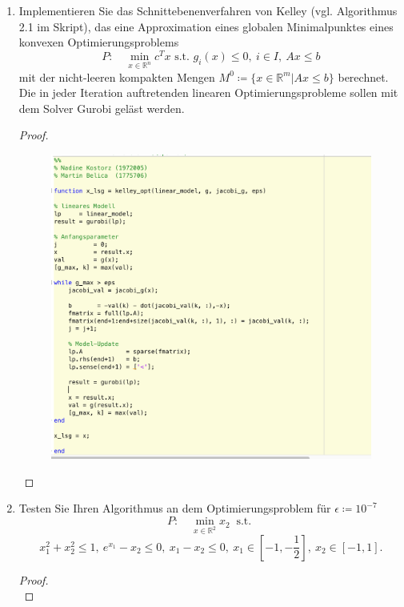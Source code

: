 \documentclass[12pt]{extreport} %
\newcommand{\R}{\mathbb{R}}
\theoremstyle{named}
\theoremstyle{nnamed}
\theoremstyle{itshape}
\theoremstyle{normal}
\begin{document}
\begin{enumerate}
	\item Implementieren Sie das Schnittebenenverfahren von Kelley (vgl. Algorithmus 2.1 im Skript), das eine Approximation eines globalen Minimalpunktes eines konvexen Optimierungsproblems
		$$ P: \quad \min_{x \in \R^n} c^T x \text{ s.t. } g_i(x) \leq 0, ~ i \in I, ~Ax \leq b $$
		mit der nicht-leeren kompakten Mengen $M	^0 \coloneqq \{ x \in \R^m | Ax \leq b \}$ berechnet. Die in jeder Iteration auftretenden linearen Optimierungsprobleme sollen mit dem Solver Gurobi geläst werden.
		\begin{proof} ~\\
			\begin{figure}[h!] \centering \includegraphics[scale=0.45]{img/func} \label{fig:sub1}\end{figure} 
		\end{proof} \newpage
	\item Testen Sie Ihren Algorithmus an dem Optimierungsproblem für $\epsilon \coloneqq 10^{-7}$
		$$ P: \quad \min_{x \in \R^2} x_2 ~ \text{ s.t. } $$
		$$ x_1^2 + x_2^2 \leq 1, ~e^{x_1} - x_2 \leq 0, ~x_1 - x_2 \leq 0, ~ x_1 \in [-1, -\frac{1}{2}], ~ x_2 \in [-1, 1]. $$
		\begin{proof} ~\\

\end{proof}
\end{enumerate}
\end{document}
